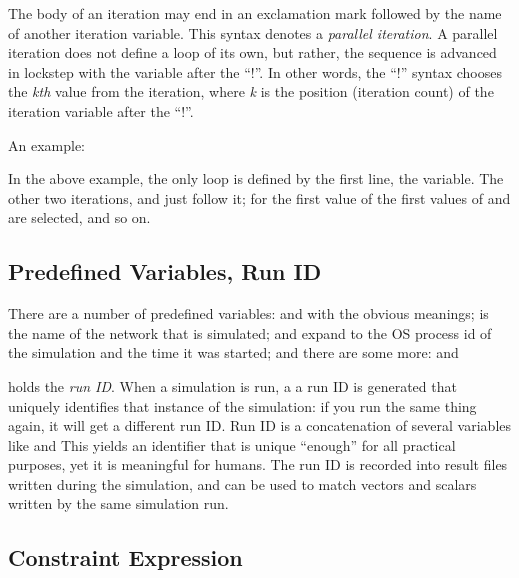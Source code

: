 The body of an iteration may end in an exclamation mark followed by the
name of another iteration variable. This syntax denotes a \textit{parallel
iteration}. A parallel iteration does not define a loop of its own, but
rather, the sequence is advanced in lockstep with the variable after the
``!''. In other words, the ``!'' syntax chooses the \textit{kth} value from
the iteration, where \textit{k} is the position (iteration count) of the
iteration variable after the ``!''.

An example:


In the above example, the only loop is defined by the first line, the 
variable. The other two iterations,  and  just follow it;
for the first value of  the first values of  and 
are selected, and so on.



\subsection{Predefined Variables, Run ID}

There are a number of predefined variables:  and
 with the obvious meanings;  is the
name of the network that is simulated;  and
 expand to the OS process id of the simulation and the
time it was started; and there are some more: 
 and 

 holds the \textit{run ID}. When a simulation is run, a a
run ID is generated that uniquely identifies that instance of the
simulation: if you run the same thing again, it will get a different run
ID. Run ID is a concatenation of several variables like
   and
 This yields an identifier that is unique ``enough''
for all practical purposes, yet it is meaningful for humans. The run ID is
recorded into result files written during the simulation, and can be used
to match vectors and scalars written by the same simulation run.


\subsection{Constraint Expression}

